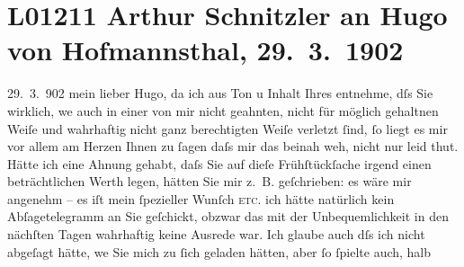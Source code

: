 

\section[Arthur Schnitzler an Hugo von Hofmannsthal, 29. 3. 1902]{L01211 Arthur Schnitzler an Hugo von Hofmannsthal, 29. 3. 1902}
\nopagebreak{}
\rehead{ }\normalsize\beginnumbering{}
\toendnotes[C]{\smallbreak\pagebreak[2]}
\toendnotes[C]{\smallbreak}
\toendnotes[C]{\smallbreak}
\pstart
           \raggedleft{}{\pb}29. 3. 902\pend
           \vspace{0.5em}
\pstart
           mein lieber Hugo, da ich aus Ton u Inhalt Ihres \label{K_L01211-1v}\label{K_L01211-1} entnehme,
               dſs Sie wirklich, we{\geminationn} auch in einer von mir nicht
               geahnten, nicht für möglich gehaltnen Weiſe und wahrhaftig nicht ganz berechtigten
               Weiſe verletzt{ }ſind,{ }ſo liegt es mir vor {\pb}allem am Herzen
               Ihnen zu{ }ſagen daſs mir das beinah weh, nicht \introOben{}nur\introOben{} leid thut.
               Hätte ich eine Ahnung gehabt, daſs Sie auf dieſe Frühſtückſache irgend einen
               beträchtlichen Werth legen, hätten Sie mir z. B. geſchrieben: es wäre mir angenehm –
                  {\pb}es iſt mein{ }ſpezieller Wunſch \textsc{etc}. ich hätte natürlich kein Abſagetelegramm an Sie geſchickt, obzwar das
               mit der Unbequemlichkeit in den nächſten Tagen wahrhaftig keine Ausrede war. Ich
               glaube auch dſs ich nicht abgeſagt hätte, we{\geminationn} Sie mich
               zu {\pb}ſich geladen hätten, aber{ }ſo{ }ſpielte auch, halb
